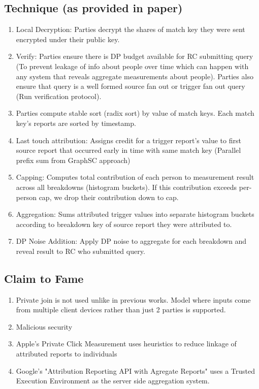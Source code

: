 \subsection{Technique (as provided in paper)}
\begin{enumerate}
   \item Local Decryption: Parties decrypt the shares of match key they were sent encrypted under their public key.
   \item Verify: Parties ensure there is DP budget available for RC submitting query (To prevent leakage of info about people over time which can happen with any system that reveals aggregate measurements about people). Parties also ensure that query is a well formed source fan out or trigger fan out query (Run verification protocol).
   \item Parties compute stable sort (radix sort) by value of match keys. Each match key's reports are sorted by timestamp. 
   \item Last touch attribution: Assigns credit for a trigger report's value to first source report that occurred early in time with same match key (Parallel prefix sum from GraphSC approach)
   \item Capping: Computes total contribution of each person to measurement result across all breakdowns (histogram buckets). If this contribution exceeds per-person cap, we drop their contribution down to cap.
   \item Aggregation: Sums attributed trigger values into separate histogram buckets according to breakdown key of source report they were attributed to.
   \item DP Noise Addition: Apply DP noise to aggregate for each breakdown and reveal result to RC who submitted query. 
\end{enumerate}

\subsection{Claim to Fame}
\begin{enumerate}
    \item Private join is not used unlike in previous works. Model where inputs come from multiple client devices rather than just 2 parties is supported.
    \item Malicious security
    \item Apple's Private Click Measurement uses heuristics to reduce linkage of attributed reports to individuals
    \item Google's "Attribution Reporting API with Agregate Reports" uses a Trusted Execution Environment as the server side aggregation system.
\end{enumerate}




%
